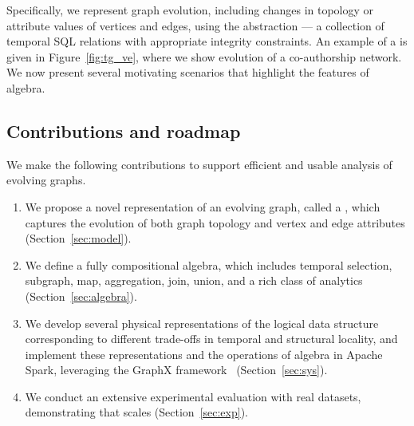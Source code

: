 Specifically, we represent graph evolution, including changes in
topology or attribute values of vertices and edges, using the \tg
abstraction --- a collection of temporal SQL relations with
appropriate integrity constraints.  An example of a \tg is given in
Figure~\ref{fig:tg_ve}, where we show evolution of a co-authorship
network.  We now present several motivating scenarios that highlight
the features of \ql algebra.



\subsection{Contributions and roadmap}


We make the following contributions to support efficient and usable
analysis of evolving graphs.

\begin{enumerate}[noitemsep,leftmargin=*]

\item We propose a novel representation of an evolving graph, called a \tg,
  which captures the evolution of both graph topology and vertex and edge attributes (Section~\ref{sec:model}).  

\item We define a fully compositional \tg algebra, which includes
  temporal selection, subgraph, map, aggregation, join, union, and a
  rich class of analytics (Section~\ref{sec:algebra}).

\item We develop several physical representations of the logical \tg
  data structure corresponding to different trade-offs in temporal and
  structural locality, and implement these representations and the operations of \tg algebra in Apache Spark,
  leveraging the GraphX
  framework~\cite{DBLP:conf/osdi/GonzalezXDCFS14} 
  (Section~\ref{sec:sys}).  

\item We conduct an extensive experimental evaluation with real
  datasets, demonstrating that \ql scales
  (Section~\ref{sec:exp}).

\end{enumerate}

